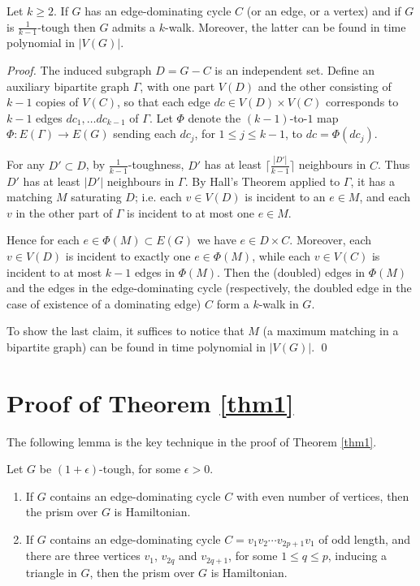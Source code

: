 \documentclass[runningheads,a4paper]{llncs}
\begin{document}
\begin{lemma}\label{addtec}
Let $k\geq 2$.
If $G$ has an edge-dominating cycle $C$ (or an edge, or a vertex)
and if $G$ is $\frac{1}{k-1}$-tough then $G$ admits a $k$-walk.
Moreover, the latter can be found in time polynomial in $|V(G)|$.
\end{lemma}
\begin{proof}
The induced subgraph $D=G-C$ is an independent set. Define an auxiliary bipartite
graph $\Gamma$, with one part $V(D)$ and the other consisting of $k-1$ copies of $V(C)$,
so that each edge $dc\in V(D)\times V(C)$ corresponds to $k-1$ edges
$dc_1,\dots dc_{k-1}$ of $\Gamma$. Let $\Phi$ denote the $(k-1)$-to-$1$ map
$\Phi: E(\Gamma)\to E(G)$ sending each $dc_j$, for $1\leq j\leq k-1$, to $dc=\Phi(dc_j)$.

For any $D'\subset D$, by $\frac{1}{k-1}$-toughness, $D'$ has at least
$\lceil\frac{|D'|}{k-1}\rceil$ neighbours in $C$. Thus $D'$ has at
least $|D'|$ neighbours in $\Gamma$.  By Hall's Theorem \cite[Theorem 16.4]{bomu08} applied
to $\Gamma$, it has a matching $M$ saturating $D$; i.e.  each $v\in V(D)$ is
incident to an $e\in M$, and each $v$ in the other part of $\Gamma$ is
incident to at most one $e\in M$.

Hence for each $e\in\Phi(M)\subset E(G)$ we have $e\in D\times C$.
Moreover, each $v\in V(D)$ is incident to
exactly one $e\in \Phi(M)$, while each $v\in V(C)$ is incident to at most
$k-1$ edges in $\Phi(M)$. Then the (doubled) edges in $\Phi(M)$ and the edges
in the edge-dominating cycle (respectively, the doubled edge in the case of existence of a dominating edge) $C$ form a
$k$-walk in $G$.

To show the last claim, it suffices to notice that $M$ (a maximum matching
in a bipartite graph) can be found in time polynomial
in $|V(G)|$. \qed
\end{proof}

\section{Proof of Theorem \ref{thm1}}
The following lemma is the key technique in the proof of Theorem \ref{thm1}.
\begin{lemma}\label{keylem}
Let $G$ be $(1+\epsilon)$-tough, for some $\epsilon>0$.
\begin{enumerate}
\item If $G$ contains an edge-dominating cycle $C$ with even number of vertices, then the prism over $G$ is Hamiltonian.
\item If $G$ contains an edge-dominating cycle $C=v_1v_2\cdots v_{2p+1}v_1$ of odd length, and there are three vertices $v_1$, $v_{2q}$ and $v_{2q+1}$, for some $1\le q\le p$, inducing a triangle in $G$, then the prism over $G$ is Hamiltonian.
\end{enumerate}
\end{lemma}
\end{document}
